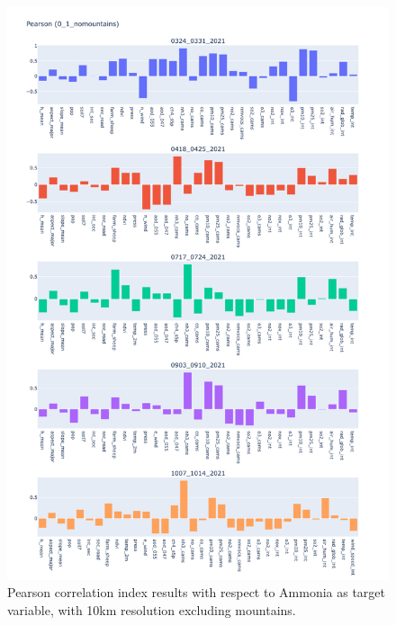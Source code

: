 \begin{figure}[H]
    \centering
    \includegraphics[scale=0.35]{images/tests/0_1_nomountainsnh3_st_pearson.png}
    \caption{Pearson correlation index results with respect to Ammonia as target variable, with 10km resolution excluding mountains.}
    \label{fig:overview}
\end{figure}
